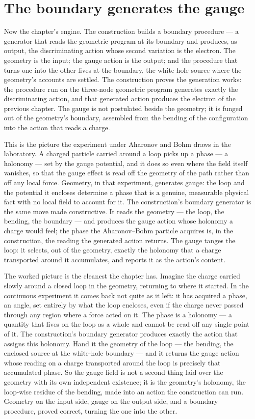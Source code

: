 \section{The boundary generates the gauge}
\label{se:the-boundary-generates-the-gauge}

Now the chapter's engine. The construction builds a boundary procedure --- a generator that reads the
geometric program at its boundary and produces, as output, the discriminating action whose second
variation is the electron. The geometry is the input; the gauge action is the output; and the procedure
that turns one into the other lives at the boundary, the white-hole source where the geometry's accounts
are settled. The construction proves the generation works: the procedure run on the three-node geometric
program generates exactly the discriminating action, and that generated action produces the electron of
the previous chapter. The gauge is not postulated beside the geometry; it is funged out of the
geometry's boundary, assembled from the bending of the configuration into the action that reads a charge.

This is the picture the experiment under Aharonov and Bohm draws in the laboratory. A charged particle
carried around a loop picks up a phase --- a holonomy --- set by the gauge potential, and it does so even
where the field itself vanishes, so that the gauge effect is read off the geometry of the path rather
than off any local force. Geometry, in that experiment, generates gauge: the loop and the potential it
encloses determine a phase that is a genuine, measurable physical fact with no local field to account
for it. The construction's boundary generator is the same move made constructive. It reads the geometry
--- the loop, the bending, the boundary --- and produces the gauge action whose holonomy a charge would
feel; the phase the Aharonov--Bohm particle acquires is, in the construction, the reading the generated
action returns. The gauge tanges the loop: it selects, out of the geometry, exactly the holonomy that a
charge transported around it accumulates, and reports it as the action's content.

The worked picture is the cleanest the chapter has. Imagine the charge carried slowly around a closed
loop in the geometry, returning to where it started. In the continuous experiment it comes back not
quite as it left: it has acquired a phase, an angle, set entirely by what the loop encloses, even if the
charge never passed through any region where a force acted on it. The phase is a holonomy --- a quantity
that lives on the loop as a whole and cannot be read off any single point of it. The construction's
boundary generator produces exactly the action that assigns this holonomy. Hand it the geometry of the
loop --- the bending, the enclosed source at the white-hole boundary --- and it returns the gauge action
whose reading on a charge transported around the loop is precisely that accumulated phase. So the gauge
field is not a second thing laid over the geometry with its own independent existence; it is the
geometry's holonomy, the loop-wise residue of the bending, made into an action the construction can run.
Geometry on the input side, gauge on the output side, and a boundary procedure, proved correct, turning
the one into the other.


